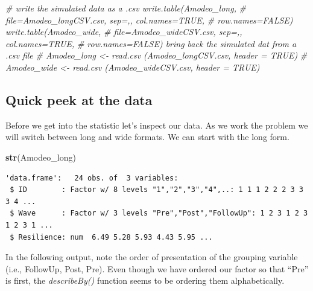 \documentclass[
  11pt,
]{book}
\newenvironment{Shaded}{\begin{snugshade}}{\end{snugshade}}
\newcommand{\AttributeTok}[1]{\textcolor[rgb]{0.27,0.27,0.27}{#1}}
\newcommand{\CommentTok}[1]{\textcolor[rgb]{0.37,0.37,0.37}{\textit{#1}}}
\newcommand{\ConstantTok}[1]{\textcolor[rgb]{0.37,0.37,0.37}{#1}}
\newcommand{\DecValTok}[1]{\textcolor[rgb]{0.06,0.06,0.06}{#1}}
\newcommand{\FunctionTok}[1]{\textcolor[rgb]{0.27,0.27,0.27}{\textbf{#1}}}
\newcommand{\NormalTok}[1]{#1}
\newcommand{\SpecialCharTok}[1]{\textcolor[rgb]{0.43,0.43,0.43}{\textbf{#1}}}
\begin{document}
\begin{Shaded}
\begin{Highlighting}[]
\CommentTok{\# write the simulated data as a .csv write.table(Amodeo\_long,}
\CommentTok{\# file=\textquotesingle{}Amodeo\_longCSV.csv\textquotesingle{}, sep=\textquotesingle{},\textquotesingle{}, col.names=TRUE,}
\CommentTok{\# row.names=FALSE) write.table(Amodeo\_wide,}
\CommentTok{\# file=\textquotesingle{}Amodeo\_wideCSV.csv\textquotesingle{}, sep=\textquotesingle{},\textquotesingle{}, col.names=TRUE,}
\CommentTok{\# row.names=FALSE) bring back the simulated dat from a .csv file}
\CommentTok{\# Amodeo\_long \textless{}{-} read.csv (\textquotesingle{}Amodeo\_longCSV.csv\textquotesingle{}, header = TRUE)}
\CommentTok{\# Amodeo\_wide \textless{}{-} read.csv (\textquotesingle{}Amodeo\_wideCSV.csv\textquotesingle{}, header = TRUE)}
\end{Highlighting}
\end{Shaded}

\hypertarget{quick-peek-at-the-data-5}{%
\subsection{Quick peek at the data}\label{quick-peek-at-the-data-5}}

Before we get into the statistic let's inspect our data. As we work the problem we will switch between long and wide formats. We can start with the long form.

\begin{Shaded}
\begin{Highlighting}[]
\FunctionTok{str}\NormalTok{(Amodeo\_long)}
\end{Highlighting}
\end{Shaded}

\begin{verbatim}
'data.frame':   24 obs. of  3 variables:
 $ ID        : Factor w/ 8 levels "1","2","3","4",..: 1 1 1 2 2 2 3 3 3 4 ...
 $ Wave      : Factor w/ 3 levels "Pre","Post","FollowUp": 1 2 3 1 2 3 1 2 3 1 ...
 $ Resilience: num  6.49 5.28 5.93 4.43 5.95 ...
\end{verbatim}

In the following output, note the order of presentation of the grouping variable (i.e., FollowUp, Post, Pre). Even though we have ordered our factor so that ``Pre'' is first, the \emph{describeBy()} function seems to be ordering them alphabetically.

\begin{Shaded}
\end{Shaded}
\end{document}
